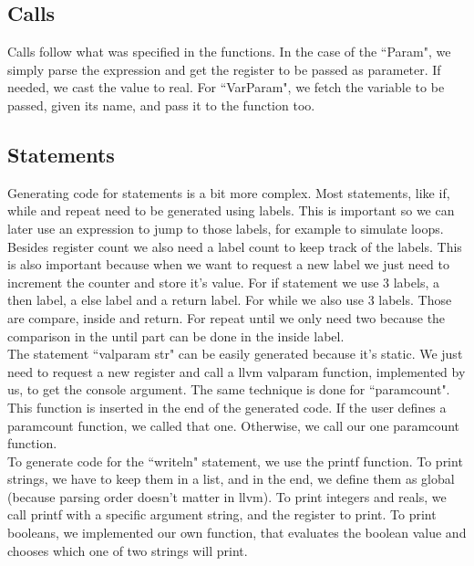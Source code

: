 \documentclass[12pt]{article}
\begin{document}
\subsection{Calls}

Calls follow what was specified in the functions. In the case of the ``Param", we simply parse the expression and get the register to be passed as parameter. If needed, we cast the value to real. For ``VarParam", we fetch the variable to be passed, given its name, and pass it to the function too.

\subsection{Statements}

Generating code for statements is a bit more complex. Most statements, like if, while and repeat need to be generated using labels. This is important so we can later use an expression to jump to those labels, for example to simulate loops. \\ 
Besides register count we also need a label count to keep track of the labels. This is also important because when we want to request a new label we just need to increment the counter and store it's value. For if statement we use 3 labels, a then label, a else label and a return label. For while we also use 3 labels. Those are compare, inside and return. For repeat until we only need two because the comparison in the until part can be done in the inside label. \\
The statement ``valparam str" can be easily generated because it's static. We just need to request a new register and call a llvm valparam function, implemented by us, to get the console argument. The same technique is done for ``paramcount". This function is inserted in the end of the generated code. If the user defines a paramcount function, we called that one. Otherwise, we call our one paramcount function.\\
To generate code for the ``writeln" statement, we use the printf function. To print strings, we have to keep them in a list, and in the end, we define them as global (because parsing order doesn't matter in llvm). To print integers and reals, we call printf with a specific argument string, and the register to print. To print booleans, we implemented our own function, that evaluates the boolean value and chooses which one of two strings will print. \\
\end{document}
